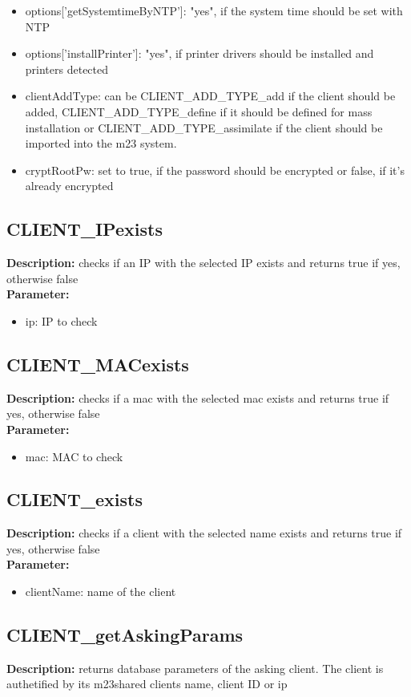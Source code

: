 \begin{itemize}
\item options['getSystemtimeByNTP']: "yes", if the system time should be set with NTP
\item options['installPrinter']: "yes", if printer drivers should be installed and printers detected
\item clientAddType: can be CLIENT\_ADD\_TYPE\_add if the client should be added, CLIENT\_ADD\_TYPE\_define if it should be defined for mass installation or CLIENT\_ADD\_TYPE\_assimilate if the client should be imported into the m23 system.
\item cryptRootPw: set to true, if the password should be encrypted or false, if it's already encrypted
\end{itemize}

\subsection{CLIENT\_IPexists}
\textbf{Description:} checks if an IP with the selected IP exists and returns true if yes, otherwise false\\
\textbf{Parameter:}
\begin{itemize}
\item ip: IP to check
\end{itemize}

\subsection{CLIENT\_MACexists}
\textbf{Description:} checks if a mac with the selected mac exists and returns true if yes, otherwise false\\
\textbf{Parameter:}
\begin{itemize}
\item mac: MAC to check
\end{itemize}

\subsection{CLIENT\_exists}
\textbf{Description:} checks if a client with the selected name exists and returns true if yes, otherwise false\\
\textbf{Parameter:}
\begin{itemize}
\item clientName: name of the client
\end{itemize}

\subsection{CLIENT\_getAskingParams}
\textbf{Description:} returns database parameters of the asking client. The client is authetified by its m23shared clients name, client ID or ip\\

